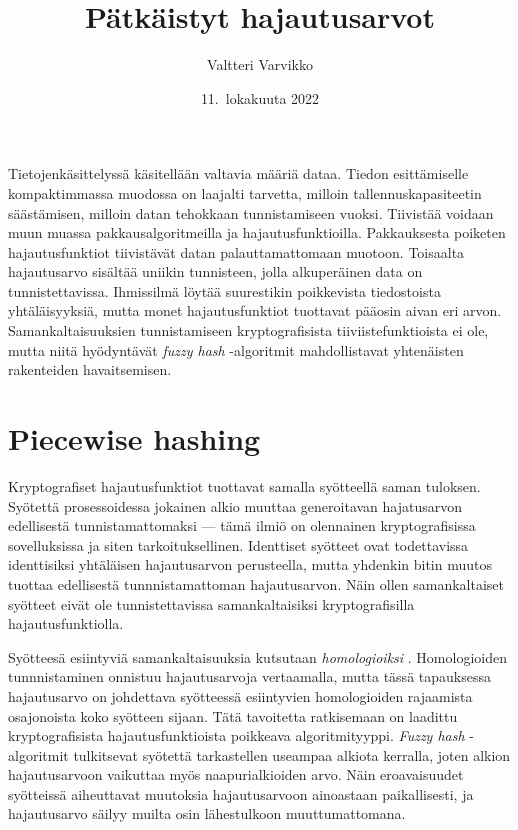 \documentclass[12pt, a4paper]{article}
\title{Pätkäistyt hajautusarvot}
\author{Valtteri Varvikko}
\date{11.\ lokakuuta 2022}
\begin{document}
	\maketitle

	Tietojenkäsittelyssä käsitellään valtavia määriä dataa. Tiedon esittämiselle kompaktimmassa
	muodossa on laajalti tarvetta, milloin tallennuskapasiteetin säästämisen, milloin
	datan tehokkaan tunnistamiseen vuoksi. Tiivistää voidaan muun muassa pakkausalgoritmeilla ja
	hajautusfunktioilla. 
	Pakkauksesta poiketen hajautusfunktiot tiivistävät datan palauttamattomaan muotoon.
	Toisaalta hajautusarvo sisältää uniikin tunnisteen, jolla
	alkuperäinen data on tunnistettavissa. 
	Ihmissilmä löytää suurestikin poikkevista tiedostoista yhtäläisyyksiä,
	mutta monet hajautusfunktiot tuottavat pääosin aivan eri arvon.
	Samankaltaisuuksien tunnistamiseen kryptografisista tiiviistefunktioista ei ole,
	mutta niitä hyödyntävät \textit{fuzzy hash} -algoritmit mahdollistavat
	yhtenäisten rakenteiden havaitsemisen.

	\section*{Piecewise hashing}

	Kryptografiset hajautusfunktiot tuottavat samalla syötteellä saman tuloksen.
	Syötettä prosessoidessa jokainen alkio muuttaa generoitavan hajatusarvon
	edellisestä tunnistamattomaksi --- tämä ilmiö on olennainen kryptografisissa sovelluksissa
	ja siten tarkoituksellinen.
	Identtiset syötteet ovat todettavissa identtisiksi yhtäläisen hajautusarvon
	perusteella, mutta yhdenkin bitin muutos tuottaa edellisestä tunnnistamattoman
	hajautusarvon. Näin ollen samankaltaiset syötteet eivät ole tunnistettavissa
	samankaltaisiksi kryptografisilla hajautusfunktiolla.

	Syötteesä esiintyviä samankaltaisuuksia kutsutaan
	\textit{homologioiksi} \parencite{IDENT}. Homologioiden tunnnistaminen onnistuu hajautusarvoja
	vertaamalla, mutta tässä tapauksessa hajautusarvo on johdettava
	syötteessä esiintyvien homologioiden rajaamista osajonoista koko syötteen sijaan.
	Tätä tavoitetta ratkisemaan on laadittu kryptografisista hajautusfunktioista
	poikkeava algoritmityyppi. \textit{Fuzzy hash} -algoritmit tulkitsevat
	syötettä tarkastellen useampaa alkiota kerralla, joten alkion
	hajautusarvoon vaikuttaa myös naapurialkioiden arvo. Näin eroavaisuudet
	syötteissä aiheuttavat muutoksia hajautusarvoon ainoastaan paikallisesti,
	ja hajautusarvo säilyy muilta osin lähestulkoon muuttumattomana.
\end{document}
